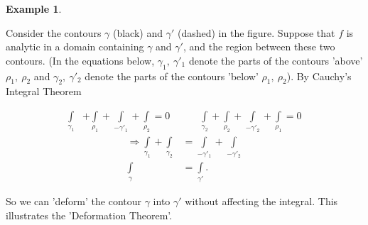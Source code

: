 \documentclass[12pt, a4paper]{article}
\theoremstyle{plain}
\theoremstyle{definition}
\newtheorem{example}{Example} %
\begin{document}
			\begin{example}
				\begin{multicols}{2}
					Consider the contours $\gamma$ (black) and $\gamma'$ (dashed) in the figure. Suppose that $f$ is analytic in a domain containing $\gamma$ and $\gamma'$, and the region between these two contours. (In the equations below, $\gamma_1,\:\gamma'_1$ denote the parts of the contours 'above' $\rho_1,\:\rho_2$ and $\gamma_2,\:\gamma'_2$ denote the parts of the contours 'below' $\rho_1,\:\rho_2$). By Cauchy's Integral Theorem
					\begin{figure}[H]
					\flushright
					\end{figure}
				\end{multicols}
				\begin{align*}
						\int\limits_{\gamma_1} &+ 
						\int\limits_{\rho_1} + 
						\int\limits_{-\gamma'_1}+
						\int\limits_{\rho_2} = 0\quad\quad\quad
						\int\limits_{\gamma_2} + 
						\int\limits_{\rho_2} + 
						\int\limits_{-\gamma'_2}+
						\int\limits_{\rho_1} = 0
					\end{align*}
					\begin{align*}
						\Rightarrow \int\limits_{\gamma_1} + \int\limits_{\gamma_2} &=
						 \int\limits_{-\gamma'_1} + \int\limits_{-\gamma'_2} \\
						 \int\limits_{\gamma} &= \int\limits_{\gamma'}.
					\end{align*}
			\end{example}
			So we can 'deform' the contour $\gamma$ into $\gamma'$ without affecting the integral. This illustrates the 'Deformation Theorem'.
\end{document}
